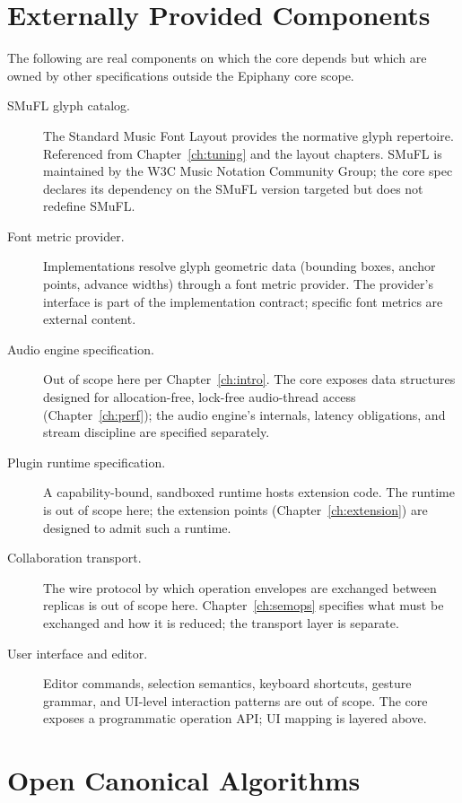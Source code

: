 \documentclass[11pt,letterpaper]{report}
\begin{document}
\section{Externally Provided Components}
\label{sec:deferred:external}

The following are real components on which the core depends but
which are owned by other specifications outside the
Epiphany core scope.

\begin{description}
  \item[SMuFL glyph catalog.] The Standard Music Font Layout
    provides the normative glyph repertoire. Referenced from
    Chapter~\ref{ch:tuning} and the layout chapters. SMuFL is
    maintained by the W3C Music Notation Community Group; the
    core spec declares its dependency on the SMuFL version
    targeted but does not redefine SMuFL.
  \item[Font metric provider.] Implementations resolve glyph
    geometric data (bounding boxes, anchor points, advance
    widths) through a font metric provider. The provider's
    interface is part of the implementation contract; specific
    font metrics are external content.
  \item[Audio engine specification.] Out of scope here per
    Chapter~\ref{ch:intro}. The core exposes data structures
    designed for allocation-free, lock-free audio-thread access
    (Chapter~\ref{ch:perf}); the audio engine's internals,
    latency obligations, and stream discipline are specified
    separately.
  \item[Plugin runtime specification.] A capability-bound,
    sandboxed runtime hosts extension code. The runtime is
    out of scope here; the extension points
    (Chapter~\ref{ch:extension}) are designed to admit such a
    runtime.
  \item[Collaboration transport.] The wire protocol by which
    operation envelopes are exchanged between replicas is
    out of scope here. Chapter~\ref{ch:semops} specifies what
    must be exchanged and how it is reduced; the transport
    layer is separate.
  \item[User interface and editor.] Editor commands, selection
    semantics, keyboard shortcuts, gesture grammar, and
    UI-level interaction patterns are out of scope. The core
    exposes a programmatic operation API; UI mapping is
    layered above.
\end{description}

\section{Open Canonical Algorithms}
\label{sec:deferred:open-algos}
\end{document}
